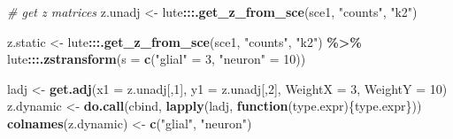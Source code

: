 \documentclass[
]{article}
\newenvironment{Shaded}{\begin{snugshade}}{\end{snugshade}}
\newcommand{\AttributeTok}[1]{\textcolor[rgb]{0.13,0.29,0.53}{#1}}
\newcommand{\CommentTok}[1]{\textcolor[rgb]{0.56,0.35,0.01}{\textit{#1}}}
\newcommand{\ControlFlowTok}[1]{\textcolor[rgb]{0.13,0.29,0.53}{\textbf{#1}}}
\newcommand{\DecValTok}[1]{\textcolor[rgb]{0.00,0.00,0.81}{#1}}
\newcommand{\FunctionTok}[1]{\textcolor[rgb]{0.13,0.29,0.53}{\textbf{#1}}}
\newcommand{\NormalTok}[1]{#1}
\newcommand{\OtherTok}[1]{\textcolor[rgb]{0.56,0.35,0.01}{#1}}
\newcommand{\SpecialCharTok}[1]{\textcolor[rgb]{0.81,0.36,0.00}{\textbf{#1}}}
\newcommand{\StringTok}[1]{\textcolor[rgb]{0.31,0.60,0.02}{#1}}
\begin{document}
\begin{Shaded}
\begin{Highlighting}[]
\CommentTok{\# get z matrices}
\NormalTok{z.unadj }\OtherTok{\textless{}{-}}\NormalTok{ lute}\SpecialCharTok{:::}\FunctionTok{.get\_z\_from\_sce}\NormalTok{(sce1, }\StringTok{"counts"}\NormalTok{, }\StringTok{"k2"}\NormalTok{)}

\NormalTok{z.static }\OtherTok{\textless{}{-}}\NormalTok{ lute}\SpecialCharTok{:::}\FunctionTok{.get\_z\_from\_sce}\NormalTok{(sce1, }\StringTok{"counts"}\NormalTok{, }\StringTok{"k2"}\NormalTok{) }\SpecialCharTok{\%\textgreater{}\%}
\NormalTok{  lute}\SpecialCharTok{:::}\FunctionTok{.zstransform}\NormalTok{(}\AttributeTok{s =} \FunctionTok{c}\NormalTok{(}\StringTok{"glial"} \OtherTok{=} \DecValTok{3}\NormalTok{, }\StringTok{"neuron"} \OtherTok{=} \DecValTok{10}\NormalTok{))}

\NormalTok{ladj }\OtherTok{\textless{}{-}} \FunctionTok{get.adj}\NormalTok{(}\AttributeTok{x1 =}\NormalTok{ z.unadj[,}\DecValTok{1}\NormalTok{], }\AttributeTok{y1 =}\NormalTok{ z.unadj[,}\DecValTok{2}\NormalTok{], }\AttributeTok{WeightX =} \DecValTok{3}\NormalTok{, }\AttributeTok{WeightY =} \DecValTok{10}\NormalTok{)}
\NormalTok{z.dynamic }\OtherTok{\textless{}{-}} \FunctionTok{do.call}\NormalTok{(cbind, }\FunctionTok{lapply}\NormalTok{(ladj, }\ControlFlowTok{function}\NormalTok{(type.expr)\{type.expr\}))}
\FunctionTok{colnames}\NormalTok{(z.dynamic) }\OtherTok{\textless{}{-}} \FunctionTok{c}\NormalTok{(}\StringTok{"glial"}\NormalTok{, }\StringTok{"neuron"}\NormalTok{)}
\end{Highlighting}
\end{Shaded}
\end{document}
